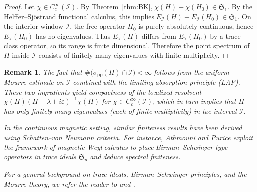 \documentclass[10pt]{amsart}
\newcommand{\1}{{\mathbb{I}}}
\newcommand{\Ic}{\mathcal{I}}
\numberwithin{equation}{section}
\newtheorem{remark}[theorem]{Remark}%
\begin{document}
\begin{proof}
Let $\chi\in C_c^\infty(\Ic)$. By Theorem~\ref{thm:BK},
$\chi(H)-\chi(H_{0})\in\mathfrak S_1$. By the Helffer--Sjöstrand functional calculus, this implies
$E_\Ic(H)-E_\Ic(H_{0})\in\mathfrak S_1$. On the interior window $\Ic$, the free operator $H_0$ is purely absolutely continuous, hence $E_\Ic(H_{0})$ has no eigenvalues. Thus $E_\Ic(H)$ differs from $E_\Ic(H_{0})$ by a trace-class operator, so its range is finite dimensional. Therefore the point spectrum of $H$ inside $\Ic$ consists of finitely many eigenvalues with finite multiplicity.
\end{proof}
\begin{remark}\label{rem:spectral-finiteness}
The fact that $\#\bigl(\sigma_{\mathrm{pp}}(H)\cap\mathcal I\bigr)<\infty$ follows from the uniform Mourre estimate on $\mathcal I$ combined with the limiting absorption principle (LAP). These two ingredients yield compactness of the localized resolvent $\chi(H)(H - \lambda \pm i\varepsilon)^{-1}\chi(H)$ for $\chi\in C_c^\infty(\mathcal{I})$, which in turn implies that $H$ has only finitely many eigenvalues (each of finite multiplicity) in the interval $\mathcal I$.

In the continuous magnetic setting, similar finiteness results have been derived using Schatten--von Neumann criteria. For instance, Athmouni and Purice \cite{AthmouniPurice-CPDE-2018} exploit the framework of magnetic Weyl calculus to place Birman--Schwinger-type operators in trace ideals $\mathfrak S_p$ and deduce spectral finiteness.

For a general background on trace ideals, Birman--Schwinger principles, and the Mourre theory, we refer the reader to \cite{Simon-TraceIdeals} and \cite[Vol.~IV]{RS}.
\end{remark}
\end{document}
